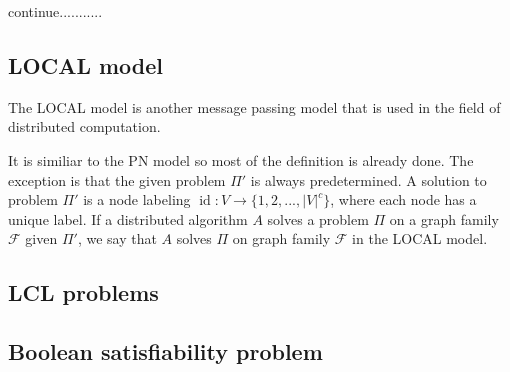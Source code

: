 
continue...........

\subsection{LOCAL model} \label{sec:local_model}
The LOCAL model is another message passing model that is used in the field of distributed computation.

It is similiar to the PN model so most of the definition is already done.
The exception is that the given problem $\Pi'$ is always predetermined.
A solution to problem $\Pi'$ is a node labeling $\operatorname{id}: V \rightarrow \{1,2,...,|V|^c\}$, where each node has a unique label.
If a distributed algorithm $A$ solves a problem $\Pi$ on a graph family $\mathcal{F}$ given $\Pi'$, we say that $A$ solves $\Pi$ on graph family $\mathcal{F}$ in the LOCAL model.


\subsection{LCL problems} \label{sec:lcl_problems}

\subsection{Boolean satisfiability problem}


\clearpage

